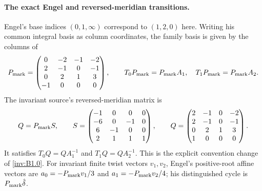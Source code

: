 \paragraph{The exact Engel and reversed-meridian transitions.}
Engel's base indices $(0,1,\infty)$ correspond to $(1,2,0)$ here.
Writing his common integral basis as column coordinates, the family
basis is given by the columns of
\[
 P_{\rm mark}=\begin{pmatrix}
 0&-2&-1&-2\\2&-1&0&-1\\0&2&1&3\\-1&0&0&0
 \end{pmatrix},\qquad
 T_0P_{\rm mark}=P_{\rm mark}A_1,\quad
 T_1P_{\rm mark}=P_{\rm mark}A_2.
\]
The invariant source's reversed-meridian matrix is
\[
 Q=P_{\rm mark}S,\qquad
 S=\begin{pmatrix}-1&0&0&0\\-6&0&-1&0\\6&-1&0&0\\2&1&1&1\end{pmatrix},
 \qquad
 Q=\begin{pmatrix}2&-1&0&-2\\2&-1&0&-1\\0&2&1&3\\1&0&0&0\end{pmatrix}.
\]
It satisfies $T_0Q=QA_1^{-1}$ and $T_1Q=QA_2^{-1}$.
This is the explicit convention change of \cref{inv:B1.0}.
For invariant finite twist vectors $v_1,v_2$, Engel's positive-root
affine vectors are $a_0=-P_{\rm mark}v_1/3$ and
$a_1=-P_{\rm mark}v_2/4$; his distinguished cycle is
$P_{\rm mark}\hat\delta$.

